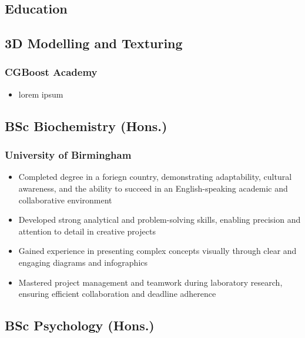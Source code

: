 \documentclass{article}
\begin{document}
\begin{paracol}{2}
  \section{Education}
  \subsection{3D Modelling and Texturing}
  \subsubsection{CGBoost Academy}
  \hspace*{\fill}{\small Awarded 2024}
  \begin{itemize}[leftmargin=*]
    \setlength\itemsep{-2pt}
    \item lorem ipsum
  \end{itemize}

  \subsection{BSc Biochemistry (Hons.)}
  \subsubsection{University of Birmingham}
  \hspace*{\fill}{\small Graduated 2019}
  \begin{itemize}[leftmargin=*]
    \setlength\itemsep{-2pt}
    \item Completed degree in a foriegn country, demonstrating adaptability, cultural awareness, and the ability to succeed in an English-speaking academic and collaborative environment
    \item Developed strong analytical and problem-solving skills, enabling precision and attention to detail in creative projects
    \item Gained experience in presenting complex concepts visually through clear and engaging diagrams and infographics
    \item Mastered project management and teamwork during laboratory research, ensuring efficient collaboration and deadline adherence
  \end{itemize}

  \subsection{BSc Psychology (Hons.)}

\end{paracol}
\end{document}
